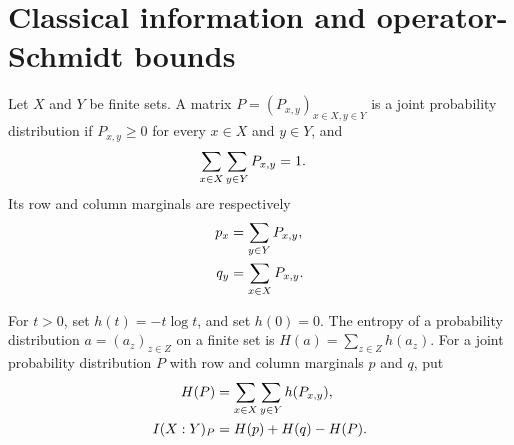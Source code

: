\section{Classical information and operator-Schmidt bounds}

\begin{definition}
    \label{def:finite_joint_distribution_marginals}
    \leanok
    Let $X$ and $Y$ be finite sets. A matrix
    $P=(P_{x,y})_{x\in X,y\in Y}$ is a joint probability distribution if
    $P_{x,y}\geq0$ for every $x\in X$ and $y\in Y$, and
    \begin{align}
        \sum_{x\in X}\sum_{y\in Y}P_{x,y}
         & =1.
        \notag
    \end{align}
    Its row and column marginals are respectively
    \begin{align}
        p_x & =\sum_{y\in Y}P_{x,y},
        \notag                       \\
        q_y & =\sum_{x\in X}P_{x,y}.
        \notag
    \end{align}
\end{definition}

\begin{definition}
    \label{def:finite_classical_mutual_information}
    \leanok
    For $t>0$, set $h(t)=-t\log t$, and set $h(0)=0$. The entropy of a
    probability distribution $a=(a_z)_{z\in Z}$ on a finite set is
    $H(a)=\sum_{z\in Z}h(a_z)$. For a joint probability distribution $P$
    with row and column marginals $p$ and $q$, put
    \begin{align}
        H(P)     & =\sum_{x\in X}\sum_{y\in Y}h(P_{x,y}),
        \notag                                            \\
        I(X:Y)_P & =H(p)+H(q)-H(P).
        \notag
    \end{align}
\end{definition}

